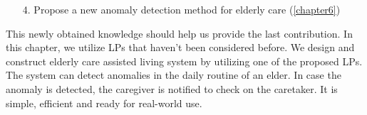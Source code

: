 \begin{enumerate}
	\item[4.] Propose a new anomaly detection method for elderly care (\ref{chapter6})
\end{enumerate}

This newly obtained knowledge should help us provide the last contribution.
In this chapter, we utilize LPs that haven't been considered before.
We design and construct elderly care assisted living system by utilizing one of the proposed LPs.
The system can detect anomalies in the daily routine of an elder.
In case the anomaly is detected, the caregiver is notified to check on the caretaker. 
It is simple, efficient and ready for real-world use.
